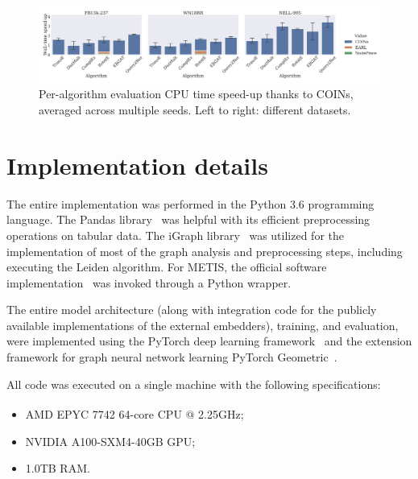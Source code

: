 \begin{figure}[ht!]
\begin{center}
\includegraphics[width=\textwidth]{figures/coins/acceleration_wall}
\end{center}
\caption[CPU time speed-up thanks to COINs.]{Per-algorithm evaluation CPU time speed-up thanks to COINs, averaged across multiple seeds. Left to right: different datasets.}
\label{fig:acceleration_wall}
\end{figure}

\section{Implementation details}
\label{sec:appendix_implementation}

The entire implementation was performed in the Python 3.6 programming language. The Pandas library~\cite{mckinney_data_2010} was helpful with its efficient preprocessing operations on tabular data. The iGraph library~\cite{csardi_igraph_2005} was utilized for the implementation of most of the graph analysis and preprocessing steps, including executing the Leiden algorithm. For METIS, the official software implementation~\cite{karypis_metis_1997} was invoked through a Python wrapper. 

The entire model architecture (along with integration code for the publicly available implementations of the external embedders), training, and evaluation, were implemented using the PyTorch deep learning framework~\cite{paszke_pytorch_2019} and the extension framework for graph neural network learning PyTorch Geometric~\cite{fey_fast_2019}. 

All code was executed on a single machine with the following specifications:
\begin{itemize}
    \item AMD EPYC\textsuperscript{\texttrademark} 7742 64-core CPU @ 2.25GHz;
    \item NVIDIA A100-SXM4-40GB GPU;
    \item 1.0TB RAM. 
\end{itemize}

